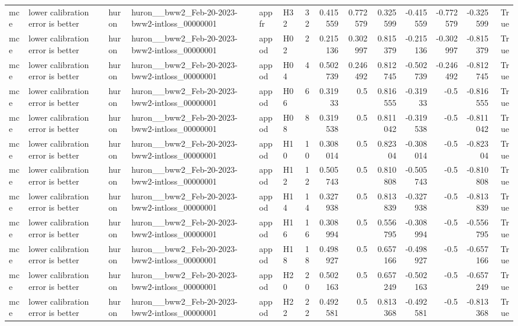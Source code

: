 \begin{longtable}{llllllrrrrrrrr}
mce & lower calibration error is better & huron & huron\_\_bww2\_Feb-20-2023-bww2-intloss\_00000001 & appfr & H32 & 32 & 0.415559 & 0.772579 & 0.325599 & -0.415559 & -0.772579 & -0.325599 & True \\
mce & lower calibration error is better & huron & huron\_\_bww2\_Feb-20-2023-bww2-intloss\_00000001 & appod & H02 & 2 & 0.215136 & 0.302997 & 0.815379 & -0.215136 & -0.302997 & -0.815379 & True \\
mce & lower calibration error is better & huron & huron\_\_bww2\_Feb-20-2023-bww2-intloss\_00000001 & appod & H04 & 4 & 0.502739 & 0.246492 & 0.812745 & -0.502739 & -0.246492 & -0.812745 & True \\
mce & lower calibration error is better & huron & huron\_\_bww2\_Feb-20-2023-bww2-intloss\_00000001 & appod & H06 & 6 & 0.31933 & 0.5 & 0.816555 & -0.31933 & -0.5 & -0.816555 & True \\
mce & lower calibration error is better & huron & huron\_\_bww2\_Feb-20-2023-bww2-intloss\_00000001 & appod & H08 & 8 & 0.319538 & 0.5 & 0.811042 & -0.319538 & -0.5 & -0.811042 & True \\
mce & lower calibration error is better & huron & huron\_\_bww2\_Feb-20-2023-bww2-intloss\_00000001 & appod & H10 & 10 & 0.308014 & 0.5 & 0.82304 & -0.308014 & -0.5 & -0.82304 & True \\
mce & lower calibration error is better & huron & huron\_\_bww2\_Feb-20-2023-bww2-intloss\_00000001 & appod & H12 & 12 & 0.505743 & 0.5 & 0.810808 & -0.505743 & -0.5 & -0.810808 & True \\
mce & lower calibration error is better & huron & huron\_\_bww2\_Feb-20-2023-bww2-intloss\_00000001 & appod & H14 & 14 & 0.327938 & 0.5 & 0.813839 & -0.327938 & -0.5 & -0.813839 & True \\
mce & lower calibration error is better & huron & huron\_\_bww2\_Feb-20-2023-bww2-intloss\_00000001 & appod & H16 & 16 & 0.308994 & 0.5 & 0.556795 & -0.308994 & -0.5 & -0.556795 & True \\
mce & lower calibration error is better & huron & huron\_\_bww2\_Feb-20-2023-bww2-intloss\_00000001 & appod & H18 & 18 & 0.498927 & 0.5 & 0.657166 & -0.498927 & -0.5 & -0.657166 & True \\
mce & lower calibration error is better & huron & huron\_\_bww2\_Feb-20-2023-bww2-intloss\_00000001 & appod & H20 & 20 & 0.502163 & 0.5 & 0.657249 & -0.502163 & -0.5 & -0.657249 & True \\
mce & lower calibration error is better & huron & huron\_\_bww2\_Feb-20-2023-bww2-intloss\_00000001 & appod & H22 & 22 & 0.492581 & 0.5 & 0.813368 & -0.492581 & -0.5 & -0.813368 & True \\

\end{longtable}
